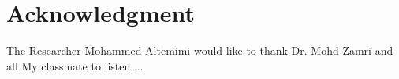\documentclass[conference, compsoc]{IEEEtran}
\begin{document}
%





\section{}



\section*{Acknowledgment}


	The Researcher Mohammed Altemimi would like to thank Dr. Mohd Zamri and all My classmate to listen ...



\end{document}
